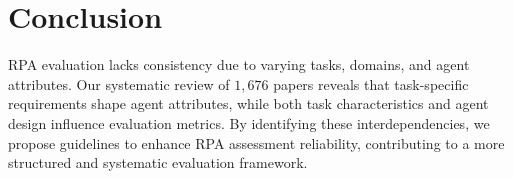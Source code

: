 \section{Conclusion}
RPA evaluation lacks consistency due to varying tasks, domains, and agent attributes. Our systematic review of $1,676$ papers reveals that task-specific requirements shape agent attributes, while both task characteristics and agent design influence evaluation metrics. By identifying these interdependencies, we propose guidelines to enhance RPA assessment reliability, contributing to a more structured and systematic evaluation framework.